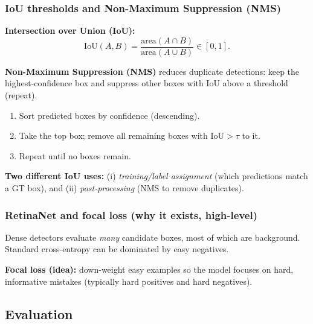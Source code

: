 \documentclass[11pt,a4paper]{article}
\begin{document}
\subsubsection{IoU thresholds and Non-Maximum Suppression (NMS)}

\begin{mathrule}
\textbf{Intersection over Union (IoU):}\quad
\[
\mathrm{IoU}(A,B)=\frac{\mathrm{area}(A\cap B)}{\mathrm{area}(A\cup B)}\in[0,1].
\]
\end{mathrule}

\begin{defbox}
\textbf{Non-Maximum Suppression (NMS)} reduces duplicate detections:
keep the highest-confidence box and suppress other boxes with IoU above a threshold (repeat).
\end{defbox}

\begin{enumerate}
  \item Sort predicted boxes by confidence (descending).
  \item Take the top box; remove all remaining boxes with $\mathrm{IoU}>\tau$ to it.
  \item Repeat until no boxes remain.
\end{enumerate}

\begin{qbox}
\textbf{Two different IoU uses:}
(i) \emph{training/label assignment} (which predictions match a GT box), and
(ii) \emph{post-processing} (NMS to remove duplicates).
\end{qbox}

\subsubsection{RetinaNet and focal loss (why it exists, high-level)}

\begin{intbox}
Dense detectors evaluate \emph{many} candidate boxes, most of which are background.
Standard cross-entropy can be dominated by easy negatives.
\end{intbox}

\begin{defbox}
\textbf{Focal loss (idea):} down-weight easy examples so the model focuses on hard, informative mistakes (typically hard positives and hard negatives).
\end{defbox}

\subsection{Evaluation}
\end{document}
